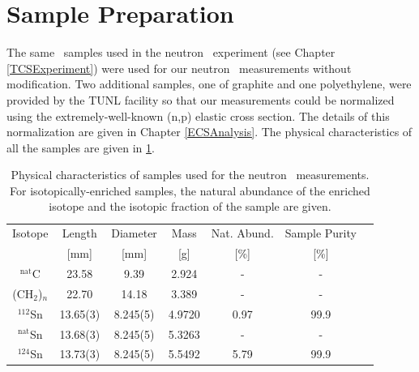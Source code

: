 \section{Sample Preparation}
The same \snTwelveNatFour\ samples used in the neutron \tot\ experiment (see Chapter
\ref{TCSExperiment}) were used for our neutron
\el\ measurements without modification. Two additional samples, one of graphite and one
polyethylene, were provided by the TUNL facility so that our measurements could
be normalized using the extremely-well-known (n,p) elastic cross section. The
details of this normalization are given in Chapter \ref{ECSAnalysis}.
The physical characteristics of all the samples are given in 
\ref{ECSSampleTable}.

\begin{table}[ht]
    \caption[Physical characteristics of samples used for neutron \el\
    measurements]
    {
        Physical characteristics of samples used for the neutron \el\
        measurements. For isotopically-enriched samples, the natural abundance
        of the enriched isotope and the isotopic fraction of the sample are
        given.
    }
    \label{ECSSampleTable}
    \begin{center}
        \begin{tabular}{ c c c c c c c }
            \hline
            Isotope & Length & Diameter
            & Mass & Nat. Abund. & Sample Purity\\
                 & [mm] & [mm] & [g] & [\%] & [\%]\\
            \hline

            $^{\text{nat}}$C & 23.58 & 9.39 & 2.924 & - & -\\
            (CH$_{2}$)$_{n}$ & 22.70 & 14.18 & 3.389 & - & -\\

            $^{112}$Sn & 13.65(3) & 8.245(5) &
            4.9720 & 0.97 & 99.9\\
            $^{\text{nat}}$Sn & 13.68(3) & 8.245(5) &
            5.3263 & - & -\\
            $^{124}$Sn & 13.73(3) & 8.245(5) &
            5.5492 & 5.79 & 99.9\\

            \hline
        \end{tabular}
    \end{center}
\end{table}

